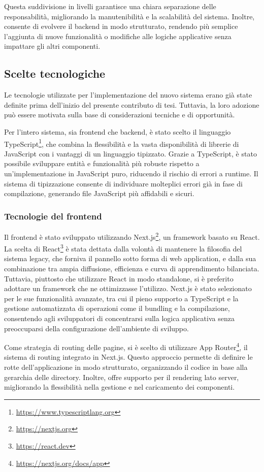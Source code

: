 Questa suddivisione in livelli garantisce una chiara separazione delle responsabilità, migliorando la manutenibilità e la scalabilità del sistema. Inoltre, consente di evolvere il backend in modo strutturato, rendendo più semplice l'aggiunta di nuove funzionalità o modifiche alle logiche applicative senza impattare gli altri componenti.

\subsection{Scelte tecnologiche}
Le tecnologie utilizzate per l'implementazione del nuovo sistema erano già state definite prima dell'inizio del presente contributo di tesi. Tuttavia, la loro adozione può essere motivata sulla base di considerazioni tecniche e di opportunità.

Per l'intero sistema, sia frontend che backend, è stato scelto il linguaggio TypeScript\footnote{\url{https://www.typescriptlang.org}}, che combina la flessibilità e la vasta disponibilità di librerie di JavaScript con i vantaggi di un linguaggio tipizzato. Grazie a TypeScript, è stato possibile sviluppare entità e funzionalità più robuste rispetto a un'implementazione in JavaScript puro, riducendo il rischio di errori a runtime. Il sistema di tipizzazione consente di individuare molteplici errori già in fase di compilazione, generando file JavaScript più affidabili e sicuri.

\subsubsection{Tecnologie del frontend}
Il frontend è stato sviluppato utilizzando Next.js\footnote{\url{https://nextjs.org}}, un framework basato su React. La scelta di React\footnote{\url{https://react.dev}} è stata dettata dalla volontà di mantenere la filosofia del sistema legacy, che forniva il pannello sotto forma di web application, e dalla sua combinazione tra ampia diffusione, efficienza e curva di apprendimento bilanciata. Tuttavia, piuttosto che utilizzare React in modo standalone, si è preferito adottare un framework che ne ottimizzasse l’utilizzo. Next.js è stato selezionato per le sue funzionalità avanzate, tra cui il pieno supporto a TypeScript e la gestione automatizzata di operazioni come il bundling e la compilazione, consentendo agli sviluppatori di concentrarsi sulla logica applicativa senza preoccuparsi della configurazione dell'ambiente di sviluppo.

Come strategia di routing delle pagine, si è scelto di utilizzare App Router\footnote{\url{https://nextjs.org/docs/app}}, il sistema di routing integrato in Next.js. Questo approccio permette di definire le rotte dell'applicazione in modo strutturato, organizzando il codice in base alla gerarchia delle directory. Inoltre, offre supporto per il rendering lato server, migliorando la flessibilità nella gestione e nel caricamento dei componenti.

